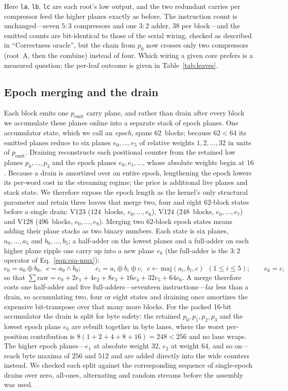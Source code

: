 \documentclass[fleqn,10pt]{wlscirep}
\begin{document}
\noindent Here \texttt{la}, \texttt{lb}, \texttt{lc} are each root's low output, and the two redundant carries per compressor feed the higher planes exactly as before. The instruction count is unchanged---seven $5{:}3$ compressors and one $3{:}2$ adder, $38$ per block---and the emitted counts are bit-identical to those of the serial wiring, checked as described in ``Correctness oracle'', but the chain from $p_0$ now crosses only two compressors (root~A, then the combine) instead of four. Which wiring a given core prefers is a measured question; the per-leaf outcome is given in Table~\ref{tab:leaves}.

\subsection*{Epoch merging and the drain}

Each block emits one $p_{\mathrm{emit}}$ carry plane, and rather than drain after every block we accumulate these planes online into a separate stack of epoch planes. One accumulator state, which we call an \emph{epoch}, spans $62$~blocks; because $62<64$ its emitted planes reduce to six planes $e_0,\dots,e_5$ of relative weights $1,2,\dots,32$ in units of $p_{\mathrm{emit}}$. Draining reconstructs each positional counter from the retained low planes $p_0,\dots,p_3$ and the epoch planes $e_0,e_1,\dots$, whose absolute weights begin at $16$. Because a drain is amortized over an entire epoch, lengthening the epoch lowers its per-word cost in the streaming regime; the price is additional live planes and stack state. We therefore expose the epoch length as the kernel's only structural parameter and retain three leaves that merge two, four and eight $62$-block states before a single drain: V123 ($124$~blocks, $e_0,\dots,e_6$), V124 ($248$~blocks, $e_0,\dots,e_7$) and V128 ($496$~blocks, $e_0,\dots,e_8$). Merging two $62$-block epoch states means adding their plane stacks as two binary numbers. Each state is six planes, $a_0,\dots,a_5$ and $b_0,\dots,b_5$; a half-adder on the lowest planes and a full-adder on each higher plane ripple one carry up into a new plane $e_6$ (the full-adder is the $3{:}2$ operator of Eq.~\ref{eqn:csa-mux}):
\[
e_0 = a_0\oplus b_0,\ \ c = a_0\land b_0;\qquad
e_i = a_i\oplus b_i\oplus c,\ \ c \leftarrow \mathrm{maj}(a_i,b_i,c)\ \ (1\le i\le 5);\qquad
e_6 = c,
\]
so that $\sum\mathrm{raw}=e_0+2e_1+4e_2+8e_3+16e_4+32e_5+64e_6$. A merge therefore costs one half-adder and five full-adders---seventeen instructions---far less than a drain, so accumulating two, four or eight states and draining once amortizes the expensive bit-transpose over that many more blocks. For the packed 16-bit accumulator the drain is split for byte safety: the retained $p_0,p_1,p_2,p_3$ and the lowest epoch plane $e_0$ are rebuilt together in byte lanes, where the worst per-position contribution is $8(1+2+4+8+16)=248<256$ and no lane wraps. The higher epoch planes---$e_1$ at absolute weight $32$, $e_2$ at weight $64$, and so on---reach byte maxima of $256$ and $512$ and are added directly into the wide counters instead. We checked each split against the corresponding sequence of single-epoch drains over zero, all-ones, alternating and random streams before the assembly was used.
\end{document}
